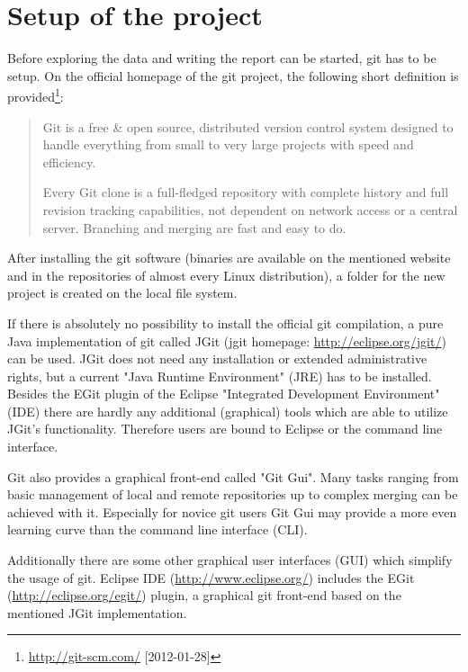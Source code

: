 \documentclass{ifacconf}
\begin{document}
\section{Setup of the project}

Before exploring the data and writing the report can be started, git has to be setup.
On the official homepage of the git project, the following short definition 
is provided\footnote{\url{http://git-scm.com/} [2012-01-28]}:

\begin{quotation}
Git is a free \& open source, distributed version control 
system designed to handle everything from small to very large projects with speed and efficiency.

Every Git clone is a full-fledged repository with complete 
history and full revision tracking capabilities, not 
dependent on network access or a central server. Branching and merging are fast and easy to do.
\end{quotation}

After installing the git software (binaries are available on the mentioned website and in 
the repositories of almost every Linux distribution), a folder for the new project is 
created on the local file system. 

If there is absolutely no possibility to install
the official git compilation, a pure Java implementation of git called JGit (jgit homepage: 
\url{http://eclipse.org/jgit/}) can be used. JGit does not need any installation or
extended administrative rights, but a current "Java Runtime Environment" (JRE) has
to be installed. Besides the EGit plugin of the Eclipse "Integrated Development 
Environment" (IDE) there are hardly any additional (graphical) tools which are able
to utilize JGit's functionality. Therefore users are bound to Eclipse or the 
command line interface.

Git also provides a graphical front-end called "Git Gui". Many tasks ranging from
basic management of local and remote repositories up to complex merging can be
achieved with it. Especially for novice git users Git Gui may provide a more even
learning curve than the command line interface (CLI).

Additionally there are some other graphical user interfaces (GUI) which
simplify the usage of git. Eclipse IDE (\url{http://www.eclipse.org/}) includes the EGit
(\url{http://eclipse.org/egit/}) plugin, a graphical git front-end based on
the mentioned JGit implementation. 
\end{document}

